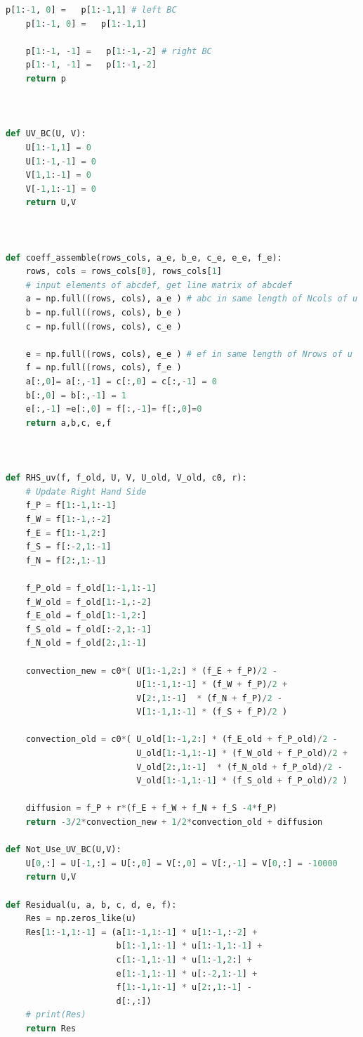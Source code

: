 \documentclass[12pt]{article}
\begin{document}
\begin{scriptsize}
\begin{lstlisting}[language=python,caption={ADI Solver}]
    p[1:-1, 0] =   p[1:-1,1] # left BC
    p[1:-1, 0] =   p[1:-1,1]

    p[1:-1, -1] =   p[1:-1,-2] # right BC
    p[1:-1, -1] =   p[1:-1,-2]
    return p



def UV_BC(U, V):
    U[1:-1,1] = 0
    U[1:-1,-1] = 0
    V[1,1:-1] = 0
    V[-1,1:-1] = 0
    return U,V



def coeff_assemble(rows_cols, a_e, b_e, c_e, e_e, f_e):
    rows, cols = rows_cols[0], rows_cols[1]
    # input elements of abcdef, get line matrix of abcdef
    a = np.full((rows, cols), a_e ) # abc in same length of Ncols of u
    b = np.full((rows, cols), b_e )
    c = np.full((rows, cols), c_e )

    e = np.full((rows, cols), e_e ) # ef in same length of Nrows of u
    f = np.full((rows, cols), f_e )
    a[:,0]= a[:,-1] = c[:,0] = c[:,-1] = 0
    b[:,0] = b[:,-1] = 1
    e[:,-1] =e[:,0] = f[:,-1]= f[:,0]=0
    return a,b,c, e,f



def RHS_uv(f, f_old, U, V, U_old, V_old, c0, r): 
    # Update Right Hand Side
    f_P = f[1:-1,1:-1]
    f_W = f[1:-1,:-2]
    f_E = f[1:-1,2:]
    f_S = f[:-2,1:-1]
    f_N = f[2:,1:-1]

    f_P_old = f_old[1:-1,1:-1]
    f_W_old = f_old[1:-1,:-2]
    f_E_old = f_old[1:-1,2:]
    f_S_old = f_old[:-2,1:-1]
    f_N_old = f_old[2:,1:-1]

    convection_new = c0*( U[1:-1,2:] * (f_E + f_P)/2 -
                          U[1:-1,1:-1] * (f_W + f_P)/2 +
                          V[2:,1:-1]  * (f_N + f_P)/2 -
                          V[1:-1,1:-1] * (f_S + f_P)/2 )
    
    convection_old = c0*( U_old[1:-1,2:] * (f_E_old + f_P_old)/2 -
                          U_old[1:-1,1:-1] * (f_W_old + f_P_old)/2 +
                          V_old[2:,1:-1]  * (f_N_old + f_P_old)/2 -
                          V_old[1:-1,1:-1] * (f_S_old + f_P_old)/2 )
    
    diffusion = f_P + r*(f_E + f_W + f_N + f_S -4*f_P)
    return -3/2*convection_new + 1/2*convection_old + diffusion

def Not_Use_UV_BC(U,V):
    U[0,:] = U[-1,:] = U[:,0] = V[:,0] = V[:,-1] = V[0,:] = -10000
    return U,V

def Residual(u, a, b, c, d, e, f):
    Res = np.zeros_like(u)
    Res[1:-1,1:-1] = (a[1:-1,1:-1] * u[1:-1,:-2] +
                      b[1:-1,1:-1] * u[1:-1,1:-1] +
                      c[1:-1,1:-1] * u[1:-1,2:] +
                      e[1:-1,1:-1] * u[:-2,1:-1] +
                      f[1:-1,1:-1] * u[2:,1:-1] -
                      d[:,:])
    # print(Res)
    return Res



\end{lstlisting}
\end{scriptsize}
\end{document}
